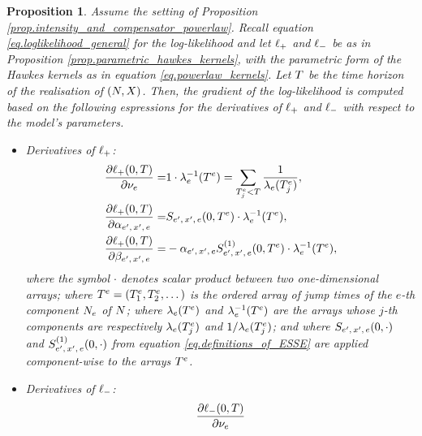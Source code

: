 \documentclass[10pt]{article}
\newtheorem{prop}[thm]{Proposition}
\begin{document}
\begin{prop}
 Assume the setting of Proposition \ref{prop.intensity_and_compensator_powerlaw}. Recall equation \eqref{eq.loglikelihood_general} for the log-likelihood and let $\lplus$ and $\lminus$ be as in Proposition \ref{prop.parametric_hawkes_kernels}, with the parametric form of the Hawkes kernels as in equation \eqref{eq.powerlaw_kernels}. Let $\timeHorizon$ be the time horizon of the realisation of $(\multiCountingProc, \stateVariable)$. 
 Then, the gradient of the log-likelihood is computed based on the following espressions for the derivatives of $\lplus$ and $\lminus$ with respect to the model's parameters.
 \begin{itemize}
  \item Derivatives of $\lplus$:
  \begin{equation}\label{eq.derivatives_of_lplus}
  \begin{split}
   \frac{\partial\lplus(0,\timeHorizon)}{\partial\baseRate_e}
   =&
   1 \cdot \intensity[e]\inverse(\arrivalTimes[e])
   = \sum_{\arrivalTimes[e]_j < \timeHorizon}\frac{1}{\intensity[e](\arrivalTimes[e]_j)},
   \\
   \frac{\partial\lplus(0,\timeHorizon)}{\partial\impCoef\subscriptexe}
   =&
   \ESSE\subscriptexe(0,\arrivalTimes[e])\cdot \intensity[e]\inverse(\arrivalTimes[e]),
   \\
   \frac{\partial\lplus(0,\timeHorizon)}{\partial\decCoef\subscriptexe}
   =&
   -\impCoef\subscriptexe
   \ESSEone\subscriptexe(0,\arrivalTimes[e])\cdot \intensity[e]\inverse(\arrivalTimes[e]),
  \end{split}
 \end{equation}
 where the symbol $\cdot$ denotes scalar product between two one-dimensional arrays; where $\arrivalTimes[e] = (\arrivalTimes[e]_1, \arrivalTimes[e]_2, \dots )$ is the ordered array of jump times of the $e$-th component $\countingProc$ of $\multiCountingProc$;  where $\intensity[e](\arrivalTimes[e])$ and $\intensity[e]\inverse(\arrivalTimes[e])$ are the arrays whose $j$-th components are respectively $\intensity[e](\arrivalTimes[e]_j)$ and $1/\intensity[e](\arrivalTimes[e]_j)$; and where $\ESSE\subscriptexe(0,\cdot)$ and $\ESSEone\subscriptexe(0,\cdot)$ from equation \eqref{eq.definitions_of_ESSE} are applied component-wise to the arrays $\arrivalTimes[e]$.
 \item Derivatives of $\lminus$:
 \begin{equation}\label{eq.derivatives_of_lminus}
  \begin{split}
   \frac{\partial\lminus(0,\timeHorizon)}{\partial\baseRate_e}

\end{split}
\end{equation}
\end{itemize}
\end{prop}
\end{document}
